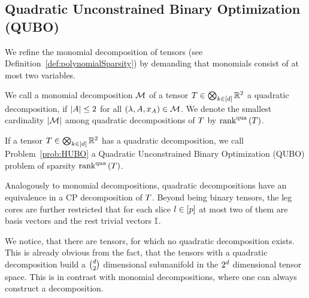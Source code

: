 \subsection{Quadratic Unconstrained Binary Optimization (QUBO)}


We refine the monomial decomposition of tensors (see Definition~\ref{def:polynomialSparsity}) by demanding that monomials consist of at most two variables.

\begin{definition}
	We call a monomial decomposition $\mathcal{M}$ of a tensor $T\in\bigotimes_{k\in[d]}\mathbb{R}^2$ a quadratic decomposition, if $\left|A\right|\leq 2$ for all $(\lambda,A,x_{A}) \in \mathcal{M}$.
	We denote the smallest cardinality $\left|\mathcal{M}\right|$ among quadratic decompositions of $T$ by $\mathrm{rank}^{\mathrm{qua}}\left(T\right)$.

	If a tensor $T\in\bigotimes_{k\in[d]}\mathbb{R}^2$ has a quadratic decomposition, we call Problem~\ref{prob:HUBO} a Quadratic Unconstrained Binary Optimization (QUBO) problem of sparsity $\mathrm{rank}^{\mathrm{qua}}\left(T\right)$.
\end{definition}

Analogously to monomial decompositions, quadratic decompositions have an equivalence in a CP decomposition of $T$.
Beyond being binary tensors, the leg cores are further restricted that for each slice $l\in[p]$ at most two of them are basis vectors and the rest trivial vectors $\mathbb{I}$.

We notice, that there are tensors, for which no quadratic decomposition exists.
This is already obvious from the fact, that the tensors with a quadratic decomposition build a $\binom{d}{2}$ dimensional submanifold in the $2^d$ dimensional tensor space.
This is in contrast with monomial decompositions, where one can always construct a decomposition.





